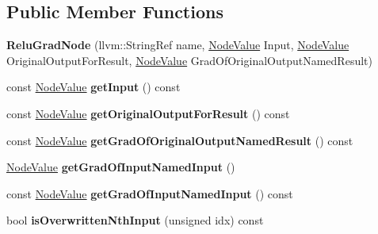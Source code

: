 \subsection*{Public Member Functions}
\begin{DoxyCompactItemize}
\item 
\mbox{\label{classglow_1_1_relu_grad_node_a11b068e4419be14dcb5ea8fa9306b222}} 
{\bfseries Relu\+Grad\+Node} (llvm\+::\+String\+Ref name, \hyperlink{structglow_1_1_node_value}{Node\+Value} Input, \hyperlink{structglow_1_1_node_value}{Node\+Value} Original\+Output\+For\+Result, \hyperlink{structglow_1_1_node_value}{Node\+Value} Grad\+Of\+Original\+Output\+Named\+Result)
\item 
\mbox{\label{classglow_1_1_relu_grad_node_a2d1797ea90e07859050127858d16ebb4}} 
const \hyperlink{structglow_1_1_node_value}{Node\+Value} {\bfseries get\+Input} () const
\item 
\mbox{\label{classglow_1_1_relu_grad_node_a7eb4404f3915a0055cc8b1823f2a32d4}} 
const \hyperlink{structglow_1_1_node_value}{Node\+Value} {\bfseries get\+Original\+Output\+For\+Result} () const
\item 
\mbox{\label{classglow_1_1_relu_grad_node_ab8cb3d7a8c1fc806d86479f1404294f8}} 
const \hyperlink{structglow_1_1_node_value}{Node\+Value} {\bfseries get\+Grad\+Of\+Original\+Output\+Named\+Result} () const
\item 
\mbox{\label{classglow_1_1_relu_grad_node_ab5f77ab89bb235f5df97c45fbbc0ef78}} 
\hyperlink{structglow_1_1_node_value}{Node\+Value} {\bfseries get\+Grad\+Of\+Input\+Named\+Input} ()
\item 
\mbox{\label{classglow_1_1_relu_grad_node_a94a26cd39a8f7b49247bb83f36a58a16}} 
const \hyperlink{structglow_1_1_node_value}{Node\+Value} {\bfseries get\+Grad\+Of\+Input\+Named\+Input} () const
\item 
\mbox{\label{classglow_1_1_relu_grad_node_a1a8070701aacdd7b0d014d7d8d22f4d8}} 
bool {\bfseries is\+Overwritten\+Nth\+Input} (unsigned idx) const
\item 

\end{DoxyCompactItemize}
